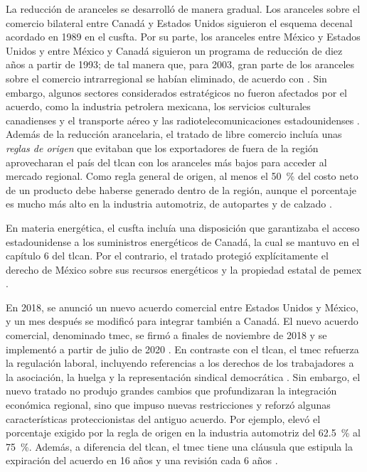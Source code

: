 La reducción de aranceles se desarrolló de manera gradual. Los aranceles sobre el comercio bilateral entre Canadá y Estados Unidos siguieron el esquema decenal acordado en 1989 en el \acrshort{cusfta}. Por su parte, los aranceles entre México y Estados Unidos y entre México y Canadá siguieron un programa de reducción de diez años a partir de 1993; de tal manera que, para 2003, gran parte de los aranceles sobre el comercio intrarregional se habían eliminado, de acuerdo con \textcite{Stanford2019}. Sin embargo, algunos sectores considerados estratégicos no fueron afectados por el acuerdo, como la industria petrolera mexicana, los servicios culturales canadienses y el transporte aéreo y las radiotelecomunicaciones estadounidenses \parencite[pp.~170, 174]{Nagy2025}. Además de la reducción arancelaria, el tratado de libre comercio incluía unas \textit{reglas de origen} que evitaban que los exportadores de fuera de la región aprovecharan el país del \gls{tlcan} con los aranceles más bajos para acceder al mercado regional. Como regla general de origen, al menos el 50~\% del costo neto de un producto debe haberse generado dentro de la región, aunque el porcentaje es mucho más alto en la industria automotriz, de autopartes y de calzado \parencite[pp.~170, 182]{Nagy2025}.


En materia energética, el \gls{cusfta} incluía una disposición que garantizaba el acceso estadounidense a los suministros energéticos de Canadá, la cual se mantuvo en el capítulo 6 del \gls{tlcan}. Por el contrario, el tratado protegió explícitamente el derecho de México sobre sus recursos energéticos y la propiedad estatal de \acrshort{pemex} \parencite[p.~282]{Stanford2019}. 

En 2018, se anunció un nuevo acuerdo comercial entre Estados Unidos y México, y un mes después se modificó para integrar también a Canadá. El nuevo acuerdo comercial, denominado \gls{tmec}, se firmó a finales de noviembre de 2018 y se implementó a partir de julio de 2020 \parencite[p.~172]{Nagy2025}. En contraste con el \gls{tlcan}, el \gls{tmec} refuerza la regulación laboral, incluyendo referencias a los derechos de los trabajadores a la asociación, la huelga y la representación sindical democrática \parencite[p.~283]{Stanford2019}. Sin embargo, el nuevo tratado no produjo grandes cambios que profundizaran la integración económica regional, sino que impuso nuevas restricciones y reforzó algunas características proteccionistas del antiguo acuerdo. Por ejemplo, elevó el porcentaje exigido por la regla de origen en la industria automotriz del 62.5~\% al 75~\%. Además, a diferencia del \gls{tlcan}, el \gls{tmec} tiene una cláusula que estipula la expiración del acuerdo en 16 años y una revisión cada 6 años \parencite[p.~184]{Nagy2025}.%

